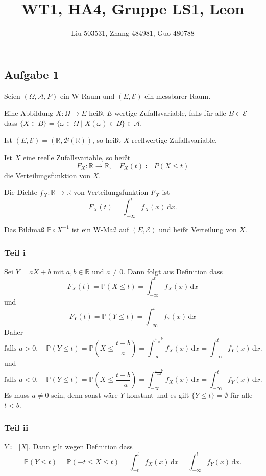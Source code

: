 \documentclass[fleqn,draft,a5paper,12pt]{article}
\title{WT1, HA4, Gruppe LS1, Leon}
\author{Liu 503531, Zhang 484981, Guo 480788}
\providecommand{\abs}[1]{\left\lvert#1\right\rvert}
\theoremstyle{remark}
\newcommand{\cP}{\mathbb{P}}
\newcommand{\dd}{\,\mathrm{d}}
\begin{document}
\maketitle

\subsection{Aufgabe 1}
Seien \((\Omega, \mathcal{A}, P)\) ein W-Raum und \((E, \mathcal{E})\) ein messbarer Raum.

Eine Abbildung \(X\colon \Omega \to E\) heißt \(E\)-wertige Zufallsvariable, falls für
alle \(B \in \mathcal{E}\) dass
\(\{X \in B\} = \{\omega \in \Omega \mid X(\omega) \in B\}\in \mathcal{A}\).

Ist \((E, \mathcal{E}) = (\mathbb{R}, \mathcal{B}(\mathbb{R}))\), so heißt \(X\) reellwertige Zufallsvariable.

Ist \(X\) eine reelle Zufallsvariable, so heißt
\[F_{X}\colon \mathbb{R} \to \mathbb{R}, \quad F_{X}(t) \coloneq P(X \le t)\]
die Verteilungsfunktion von \(X\).

Die Dichte \(f_{X}\colon \mathbb{R} \to \mathbb{R}\) von Verteilungsfunktion \(F_{X}\) ist
\[F_{X}(t) = \int_{- \infty}^{t}f_{X}(x) \dd x.\]

Das Bildmaß \(\cP \circ X^{-1}\) ist ein W-Maß auf \((E, \mathcal{E})\) und heißt
Verteilung von \(X\).
\subsubsection{Teil i}
Sei \(Y=aX+b\) mit \(a, b \in \mathbb{R}\) und \(a \ne 0\).  Dann folgt aus Definition
dass
\[
  F_{X}(t) = \cP (X \le t) = \int_{-\infty}^{t}f_{X}(x) \dd x
\]
und
\[
  F_{Y}(t) = \cP(Y \le t) = \int_{-\infty}^{t}f_{Y}(x) \dd x
\]
Daher
\[
  \text{falls } a > 0, \quad \cP(Y \le t) = \cP\left(X \le
    \frac{t-b}{a}\right) = \int_{-\infty}^{\frac{t-b}{a}}f_{X}(x) \dd x =
  \int_{-\infty}^{t}f_{Y}(x) \dd x.
\]
und
\[
  \text{falls } a < 0, \quad \cP(Y \le t) = \cP\left(X \le
    \frac{t-b}{-a}\right) = \int_{-\infty}^{\frac{t-b}{-a}}f_{X}(x) \dd x =
  \int_{-\infty}^{t}f_{Y}(x) \dd x.
\]
Es muss \(a \ne 0\) sein, denn sonst wäre \(Y\) konstant und es gilt \(\{Y
\le t\} = \emptyset\) für alle \(t < b\).
\subsubsection{Teil ii}
\(Y \coloneq \abs{X}\).  Dann gilt wegen Definition dass
\[\cP(Y \le t) = \cP(-t \le X \le t) = \int_{-t}^{t}f_{X}(x) \dd x =
  \int_{-\infty}^{t}f_{Y}(x) \dd x. \]
\end{document}
